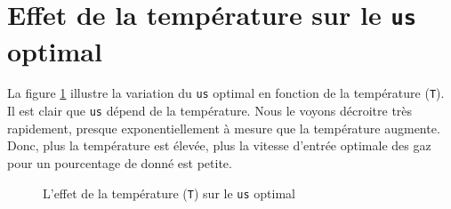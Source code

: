 \documentclass[11pt]{report}
\begin{document}
    \section{Effet de la température sur le \texttt{us} optimal}
      La figure \ref{graph:us/T} illustre la variation du \verb|us| optimal en fonction de la température (\verb|T|).
      Il est clair que \verb|us| dépend de la température. 
      Nous le voyons décroitre très rapidement, presque exponentiellement à mesure que la température augmente.
      Donc, plus la température est élevée, plus la vitesse d'entrée
      optimale des gaz pour un pourcentage de  donné est petite.
      \begin{figure}[ht]
        \centering
        
        \caption{L'effet de la température (\texttt{T}) sur le \texttt{us} optimal}
        \label{graph:us/T}
      \end{figure}
\end{document}
